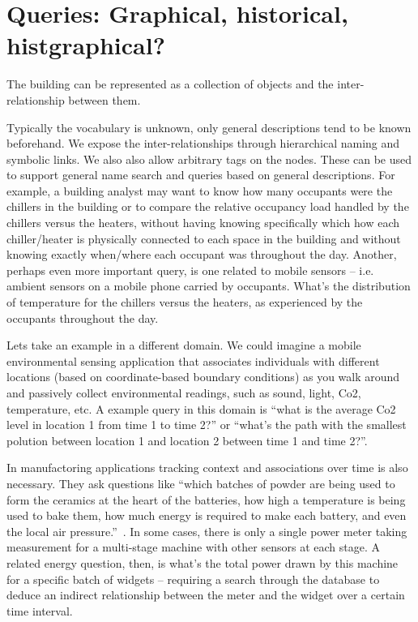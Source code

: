 \section{Queries: Graphical, historical, histgraphical?}
The building can be represented as a collection of objects and the inter-relationship between them.

Typically the vocabulary is unknown, only general descriptions tend to be known beforehand.  We expose the inter-relationships
through hierarchical naming and symbolic links.  We also also allow arbitrary tags on the nodes.  These can be used to 
support general name search and queries based on general descriptions.
For example, a building analyst may want to know how many occupants were the chillers in the building or
to compare the relative occupancy load handled by the chillers versus the heaters, without having knowing specifically
which how each chiller/heater is physically connected to each space in the building and without knowing exactly when/where
each occupant was throughout the day.
Another, perhaps even more important query, is one related to mobile sensors -- i.e. ambient sensors on a mobile 
phone carried by occupants.  What's the distribution of temperature for the chillers versus the heaters, as experienced
by the occupants throughout the day.

Lets take an example in a different domain.  We could imagine a mobile environmental sensing application that associates individuals
with different locations (based on coordinate-based boundary conditions) as you walk around and passively collect environmental
readings, such as sound, light, Co2, temperature, etc.  A example query in this domain is ``what is the average Co2 level
in location 1 from time 1 to time 2?'' or ``what's the path with the smallest polution between location 1 and location 2 between time 1 and
time 2?''.

In manufactoring applications tracking context and associations over time is also necessary.  They ask questions like 
``which batches of powder are being used to form the ceramics at the heart of the batteries, how high a temperature is being used to bake them, how much energy is required to make each battery, and even the local air pressure.''~\cite{intman}.  In some cases, there is only a single
power meter taking measurement for a multi-stage machine with other sensors at each stage.  A related energy question, then, is 
what's the total power drawn by this machine for a specific batch of widgets -- requiring a search through the database to deduce
an indirect relationship between the meter and the widget over a certain time interval.

